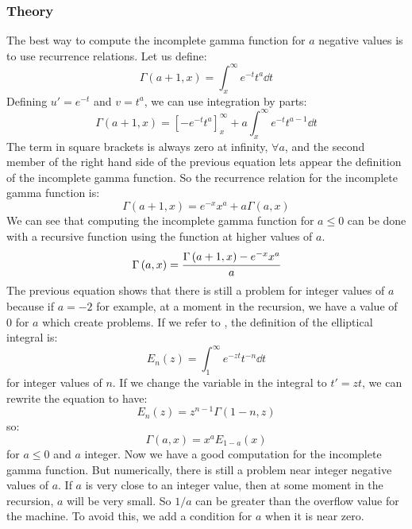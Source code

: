 \subsubsection{Theory}

The best way to compute the incomplete gamma function for $a$ negative values
is to use recurrence relations. Let us define:
%
\begin{equation}
    \Gamma\left({a+1,x}\right)=\int_x^\infty{e^{-t}{t^{a}}\dd{t}}
\end{equation}
%
Defining $u'=e^{-t}$ and $v=t^a$, we can use integration by parts:
%
\begin{equation}
    \Gamma\left({a+1,x}\right)={\left[-e^{-t}{t^a}\right]}_x^\infty + a \int_x^\infty{e^{-t}{t^{a-1}}\dd{t}}
\end{equation}
%
The term in square brackets is always zero at infinity, $\forall a$, and the
second member of the right hand side of the previous equation lets appear the
definition of the incomplete gamma function. So the recurrence relation for the
incomplete gamma function is:
%
\begin{equation}
    \Gamma\left({a+1,x}\right)=e^{-x}{x^a} + a \Gamma\left({a,x}\right)
\end{equation}
%
We can see that computing the incomplete gamma function for $a\leqslant0$ can
be done with a recursive function using the function at higher values of $a$.
%
\begin{equation}
    \Gamma\left({a,x}\right)= \cfrac{\Gamma\left({a+1,x}\right) - e^{-x}{x^a}}{a}
\end{equation}
%
The previous equation shows that there is still a problem for integer values of
$a$ because if $a=-2$ for example, at a moment in the recursion, we have a
value of 0 for $a$ which create problems. If we refer to
\citet{abramowitz+stegun}, the definition of the elliptical integral is:
%
\begin{equation}
    E_n\left({z}\right)=\int_1^\infty{e^{-zt}}{t^{-n}}\dd{t}
\end{equation}
%
for integer values of $n$. If we change the variable in the integral to
$t'=zt$, we can rewrite the equation to have:
%
\begin{equation}
    E_n\left({z}\right)={z^{n-1}}\Gamma\left({1-n,z}\right)
\end{equation}
%
so:
%
\begin{equation}
    \Gamma\left({a,x}\right)={x^a}E_{1-a}\left({x}\right)
\end{equation}
%
for $a\leq0$ and $a$ integer. Now we have a good computation for the incomplete
gamma function. But numerically, there is still a problem near integer negative
values of $a$. If $a$ is very close to an integer value, then at some moment in
the recursion, $a$ will be very small. So $1/a$ can be greater than the
overflow value for the machine. To avoid this, we add a condition for $a$ when
it is near zero.

